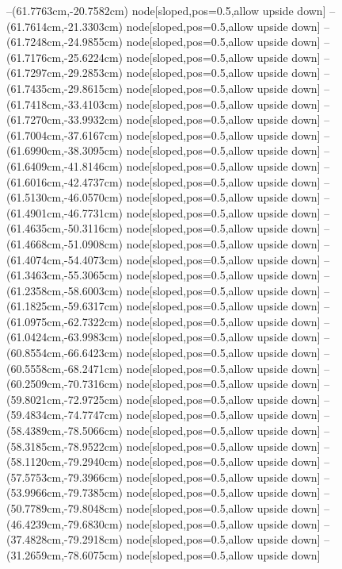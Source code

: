 --(61.7763cm,-20.7582cm) node[sloped,pos=0.5,allow upside down]{\ArrowIn}
--(61.7614cm,-21.3303cm) node[sloped,pos=0.5,allow upside down]{\arrowIn}
--(61.7248cm,-24.9855cm) node[sloped,pos=0.5,allow upside down]{\ArrowIn}
--(61.7176cm,-25.6224cm) node[sloped,pos=0.5,allow upside down]{\arrowIn}
--(61.7297cm,-29.2853cm) node[sloped,pos=0.5,allow upside down]{\ArrowIn}
--(61.7435cm,-29.8615cm) node[sloped,pos=0.5,allow upside down]{\arrowIn}
--(61.7418cm,-33.4103cm) node[sloped,pos=0.5,allow upside down]{\ArrowIn}
--(61.7270cm,-33.9932cm) node[sloped,pos=0.5,allow upside down]{\arrowIn}
--(61.7004cm,-37.6167cm) node[sloped,pos=0.5,allow upside down]{\ArrowIn}
--(61.6990cm,-38.3095cm) node[sloped,pos=0.5,allow upside down]{\arrowIn}
--(61.6409cm,-41.8146cm) node[sloped,pos=0.5,allow upside down]{\ArrowIn}
--(61.6016cm,-42.4737cm) node[sloped,pos=0.5,allow upside down]{\arrowIn}
--(61.5130cm,-46.0570cm) node[sloped,pos=0.5,allow upside down]{\ArrowIn}
--(61.4901cm,-46.7731cm) node[sloped,pos=0.5,allow upside down]{\arrowIn}
--(61.4635cm,-50.3116cm) node[sloped,pos=0.5,allow upside down]{\ArrowIn}
--(61.4668cm,-51.0908cm) node[sloped,pos=0.5,allow upside down]{\arrowIn}
--(61.4074cm,-54.4073cm) node[sloped,pos=0.5,allow upside down]{\ArrowIn}
--(61.3463cm,-55.3065cm) node[sloped,pos=0.5,allow upside down]{\arrowIn}
--(61.2358cm,-58.6003cm) node[sloped,pos=0.5,allow upside down]{\ArrowIn}
--(61.1825cm,-59.6317cm) node[sloped,pos=0.5,allow upside down]{\ArrowIn}
--(61.0975cm,-62.7322cm) node[sloped,pos=0.5,allow upside down]{\ArrowIn}
--(61.0424cm,-63.9983cm) node[sloped,pos=0.5,allow upside down]{\ArrowIn}
--(60.8554cm,-66.6423cm) node[sloped,pos=0.5,allow upside down]{\ArrowIn}
--(60.5558cm,-68.2471cm) node[sloped,pos=0.5,allow upside down]{\ArrowIn}
--(60.2509cm,-70.7316cm) node[sloped,pos=0.5,allow upside down]{\ArrowIn}
--(59.8021cm,-72.9725cm) node[sloped,pos=0.5,allow upside down]{\ArrowIn}
--(59.4834cm,-74.7747cm) node[sloped,pos=0.5,allow upside down]{\ArrowIn}
--(58.4389cm,-78.5066cm) node[sloped,pos=0.5,allow upside down]{\ArrowIn}
--(58.3185cm,-78.9522cm) node[sloped,pos=0.5,allow upside down]{\arrowIn}
--(58.1120cm,-79.2940cm) node[sloped,pos=0.5,allow upside down]{\arrowIn}
--(57.5753cm,-79.3966cm) node[sloped,pos=0.5,allow upside down]{\arrowIn}
--(53.9966cm,-79.7385cm) node[sloped,pos=0.5,allow upside down]{\ArrowIn}
--(50.7789cm,-79.8048cm) node[sloped,pos=0.5,allow upside down]{\ArrowIn}
--(46.4239cm,-79.6830cm) node[sloped,pos=0.5,allow upside down]{\ArrowIn}
--(37.4828cm,-79.2918cm) node[sloped,pos=0.5,allow upside down]{\ArrowIn}
--(31.2659cm,-78.6075cm) node[sloped,pos=0.5,allow upside down]{\ArrowIn}
